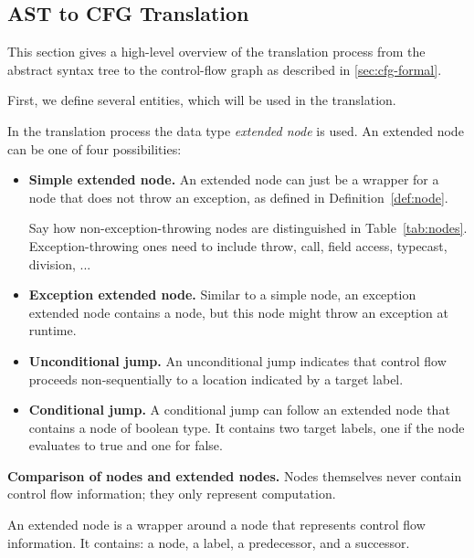 \subsection{AST to CFG Translation}
\label{sec:ast_to_cfg_translation}

This section gives a high-level overview of the translation process from the
abstract syntax tree to the control-flow graph as described in \autoref{sec:cfg-formal}.

First, we define several entities, which will be used in the translation.

\begin{definition}
    In the translation process the data type \emph{extended node} is used.
    An extended node can be one of four possibilities:
    \begin{itemize}
        \item \textbf{Simple extended node.} An extended node can just be a
          wrapper for a node that does not throw an exception,
        as defined in Definition~\ref{def:node}.
        \begin{workinprogress}
          Say how non-exception-throwing nodes are distinguished in
          Table~\autoref{tab:nodes}.  Exception-throwing ones need to
          include throw, call, field access, typecast, division, ...
        \end{workinprogress}
        \item \textbf{Exception extended node.} Similar to a simple node, an exception extended
        node contains a node, but this node might throw an exception at runtime.
        \item \textbf{Unconditional jump.} An unconditional jump indicates that control
        flow proceeds non-sequentially to a location indicated by a target label.
        \item \textbf{Conditional jump.} A conditional jump can follow an extended node
        that contains a node of boolean type. It contains two target labels, one if the
        node evaluates to true and one for false.
    \end{itemize}
\end{definition}
\textbf{Comparison of nodes and extended nodes.}
Nodes themselves never contain control flow information; they only
represent computation.

An extended node is a wrapper around a node that represents control flow
information.  It contains:  a node, a label, a predecessor, and a
successor.

